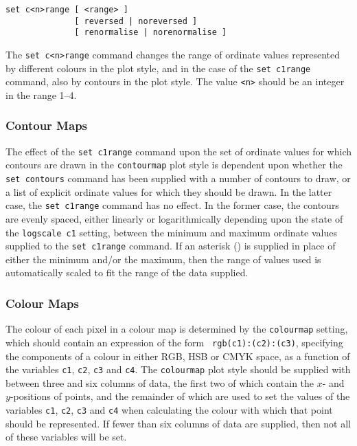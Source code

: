 \begin{verbatim}
set c<n>range [ <range> ]
              [ reversed | noreversed ]
              [ renormalise | norenormalise ]
\end{verbatim}

The {\tt set c<n>range} command changes the range of ordinate values
represented by different colours in the  plot style, and in
the case of the {\tt set c1range} command, also by contours in the
 plot style. The value {\tt <n>} should be an integer in the
range 1--4.

\subsubsection{Contour Maps}

The effect of the {\tt set c1range} command upon the set of ordinate values for
which contours are drawn in the {\tt contourmap} plot style is dependent upon
whether the {\tt set contours} command has been supplied with a number of
contours to draw, or a list of explicit ordinate values for which they should
be drawn. In the latter case, the {\tt set c1range} command has no effect. In
the former case, the contours are evenly spaced, either linearly or
logarithmically depending upon the state of the {\tt logscale c1} setting,
between the minimum and maximum ordinate values supplied to the {\tt set
c1range} command.  If an asterisk ({\tt *}) is supplied in place of either the
minimum and/or the maximum, then the range of values used is automatically
scaled to fit the range of the data supplied.

\subsubsection{Colour Maps}

The colour of each pixel in a colour map is determined by the {\tt colourmap}
setting, which should contain an expression of the form {\tt
rgb(c1):(c2):(c3)}, specifying the components of a colour in either RGB, HSB or
CMYK space, as a function of the variables {\tt c1}, {\tt c2}, {\tt c3} and
{\tt c4}. The {\tt colourmap} plot style should be supplied with between three
and six columns of data, the first two of which contain the $x$- and
$y$-positions of points, and the remainder of which are used to set the values
of the variables {\tt c1}, {\tt c2}, {\tt c3} and {\tt c4} when calculating the
colour with which that point should be represented. If fewer than six columns
of data are supplied, then not all of these variables will be set.


